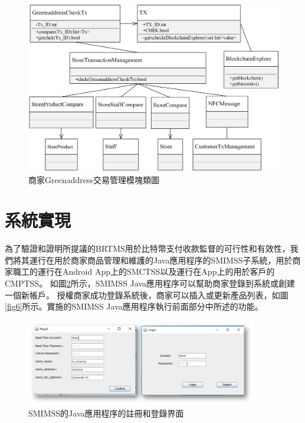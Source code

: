 	\begin{figure}[htbp]
		\centering
		\includegraphics[width = 1\textwidth]{c7.jpg}
		\caption{商家Greenaddress交易管理模塊類圖}\label{c7}
	\end{figure}




\section{系統實現}


為了驗證和證明所提議的BRTMS用於比特幣支付收款監督的可行性和有效性，我們將其運行在用於商家商品管理和維護的Java應用程序的SMIMSS子系統，用於商家職工的運行在Android App上的SMCTSS以及運行在App上的用於客戶的CMPTSS。
如圖\ref{fig5}所示，SMIMSS Java應用程序可以幫助商家登錄到系統或創建一個新帳戶。 授權商家成功登錄系統後，商家可以插入或更新產品列表，如圖\ref{fig6}所示。實施的SMIMSS Java應用程序執行前面部分中所述的功能。

\begin{figure}[htbp]
	\centering
	\includegraphics[width = 0.9\textwidth]{fig5.png}
	\caption{SMIMSS的Java應用程序的註冊和登錄界面}\label{fig5}
\end{figure}

